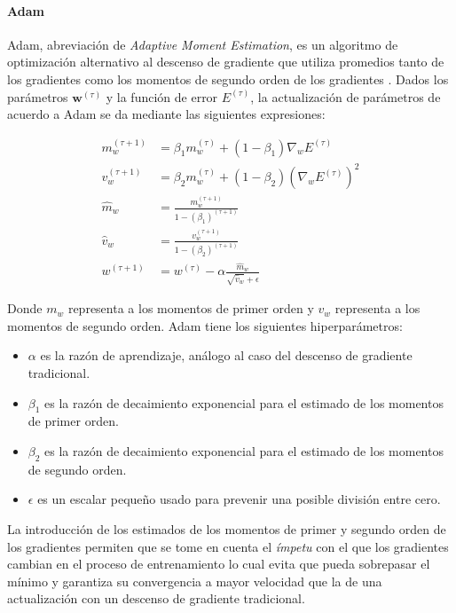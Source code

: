             \paragraph{Adam}
            Adam, abreviación de \textit{Adaptive Moment Estimation}, es un algoritmo de optimización alternativo al descenso de 
            gradiente que utiliza promedios tanto de los gradientes como los momentos de segundo orden de los gradientes \cite{kingma2014adam}. Dados 
            los parámetros $\mathbf{w}^{(\tau)}$ y la función de error $E^{(\tau)}$, la actualización de parámetros de acuerdo 
            a Adam se da mediante las siguientes expresiones:

            \begin{align}
                m_w^{(\tau + 1)} &= \beta_1 m_w^{(\tau)} + (1 - \beta_1) \nabla_w E^{(\tau)} \nonumber \\
                v_w^{(\tau + 1)} &= \beta_2 m_w^{(\tau)} + (1 - \beta_2) (\nabla_w E^{(\tau)})^2 \nonumber \\
                \hat{m}_w &= \frac{m_w^{(\tau + 1)}}{1 - (\beta_1)^{(\tau + 1)} } \nonumber \\
                \hat{v}_w &= \frac{v_w^{(\tau + 1)}}{1 - (\beta_2)^{(\tau + 1)} } \nonumber \\
                w^{(\tau + 1)} &= w^{(\tau)} - \alpha \frac{\hat{m}_w}{\sqrt{\hat{v}_w} + \epsilon} \label{eq:adam}
            \end{align}

            Donde $m_w$ representa a los momentos de primer orden y $v_w$ representa a los momentos de segundo orden. Adam 
            tiene los siguientes hiperparámetros:

            \begin{itemize}
                \item $\alpha$ es la razón de aprendizaje, análogo al caso del descenso de gradiente tradicional.
                \item $\beta_1$ es la razón de decaimiento exponencial para el estimado de los momentos de primer orden.
                \item $\beta_2$ es la razón de decaimiento exponencial para el estimado de los momentos de segundo orden.
                \item $\epsilon$ es un escalar pequeño usado para prevenir una posible división entre cero.
            \end{itemize}

            La introducción de los estimados de los momentos de primer y segundo orden de los gradientes permiten que 
            se tome en cuenta el \textit{ímpetu} con el que los gradientes cambian en el proceso de entrenamiento lo cual 
            evita que pueda sobrepasar el mínimo y garantiza su convergencia a mayor velocidad que la de una actualización 
            con un descenso de gradiente tradicional.
            

